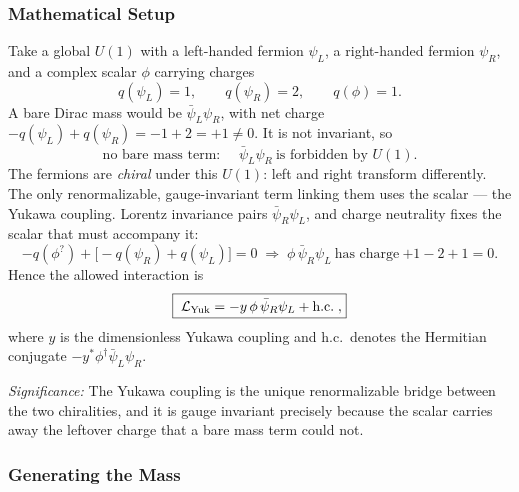 \subsubsection*{Mathematical Setup}

Take a global $U(1)$ with a left-handed fermion $\psi_L$, a right-handed fermion $\psi_R$, and a complex scalar $\phi$ carrying charges
\begin{equation}
  q(\psi_L)=1,\qquad q(\psi_R)=2,\qquad q(\phi)=1 .
  \label{eq:lec16:yukawa_charges}
\end{equation}
A bare Dirac mass would be $\bar\psi_L\psi_R$, with net charge $-q(\psi_L)+q(\psi_R)=-1+2=+1\neq0$. It is not invariant, so
\begin{equation}
  \text{no bare mass term: }\quad \bar\psi_L\psi_R\ \text{is forbidden by }U(1).
  \label{eq:lec16:no_bare_mass}
\end{equation}
The fermions are \emph{chiral} under this $U(1)$: left and right transform differently. The only renormalizable, gauge-invariant term linking them uses the scalar --- the Yukawa coupling. Lorentz invariance pairs $\bar\psi_R\psi_L$, and charge neutrality fixes the scalar that must accompany it:
\begin{equation}
  -q(\phi^{?})+\big[-q(\psi_R)+q(\psi_L)\big]=0
  \;\Rightarrow\;
  \phi\,\bar\psi_R\psi_L\ \text{has charge}\ {+1}-2+1=0 .
  \label{eq:lec16:yukawa_charge_check}
\end{equation}
Hence the allowed interaction is
\begin{equation}
  \boxed{\;\mathcal{L}_{\text{Yuk}}
  =-y\,\phi\,\bar\psi_R\psi_L+\text{h.c.}\;,}
  \label{eq:lec16:yukawa_lagrangian}
\end{equation}
where $y$ is the dimensionless Yukawa coupling and h.c.\ denotes the Hermitian conjugate $-y^\ast\phi^\dagger\bar\psi_L\psi_R$.

\textit{Significance:} The Yukawa coupling is the unique renormalizable bridge between the two chiralities, and it is gauge invariant precisely because the scalar carries away the leftover charge that a bare mass term could not.

\subsubsection*{Generating the Mass}

